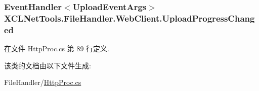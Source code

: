 \hypertarget{class_x_c_l_net_tools_1_1_file_handler_1_1_web_client_abe950fa329508b4c52e3181aeb97585f}{
\subsubsection[{Upload\-Progress\-Changed}]{\setlength{\rightskip}{0pt plus 5cm}Event\-Handler$<${\bf Upload\-Event\-Args}$>$ X\-C\-L\-Net\-Tools.\-File\-Handler.\-Web\-Client.\-Upload\-Progress\-Changed}}\label{class_x_c_l_net_tools_1_1_file_handler_1_1_web_client_abe950fa329508b4c52e3181aeb97585f}


在文件 Http\-Proc.\-cs 第 89 行定义.



该类的文档由以下文件生成\-:\begin{DoxyCompactItemize}
\item 
File\-Handler/\hyperlink{_http_proc_8cs}{Http\-Proc.\-cs}\end{DoxyCompactItemize}
